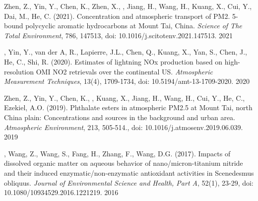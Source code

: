 \begin{cvhonors}

\publication
{Zhen, Z., Yin, Y., Chen, K., Zhen, X., ,
Jiang, H., Wang, H., Kuang, X., Cui, Y., Dai, M., He, C. (2021).
Concentration and atmospheric transport of PM2. 5-bound polycyclic aromatic hydrocarbons at Mount Tai, China.
\emph{Science of The Total Environment}, 786, 147513,
doi: 10.1016/j.scitotenv.2021.147513.} %
{2021} %

\publication
{, Yin, Y., van der A, R., Lapierre, J.L.,
Chen, Q., Kuang, X., Yan, S., Chen, J., He, C., Shi, R. (2020).
Estimates of lightning NOx production based on high-resolution OMI NO2 retrievals over the continental US.
\emph{Atmospheric Measurement Techniques}, 13(4), 1709-1734,
doi: 10.5194/amt-13-1709-2020.} %
{2020} %

\publication
{Zhen, Z., Yin, Y., Chen, K., ,
Kuang, X., Jiang, H., Wang, H., Cui, Y., He, C., Ezekiel, A.O. (2019).
Phthalate esters in atmospheric PM2.5 at Mount Tai, north China plain:
Concentrations and sources in the background and urban area.
\emph{Atmospheric Environment},
213, 505-514.,
doi: 10.1016/j.atmosenv.2019.06.039.} %
{2019} %

\publication
{, Wang, Z., Wang, S., Fang, H., Zhang, F., Wang, D.G. (2017).
Impacts of dissolved organic matter on aqueous behavior of nano/micron-titanium nitride and their induced enzymatic/non-enzymatic antioxidant activities in Scenedesmus obliquus.
\emph{Journal of Environmental Science and Health, Part A},
52(1), 23-29,
doi: 10.1080/10934529.2016.1221219.} %
{2016} %

\end{cvhonors}
